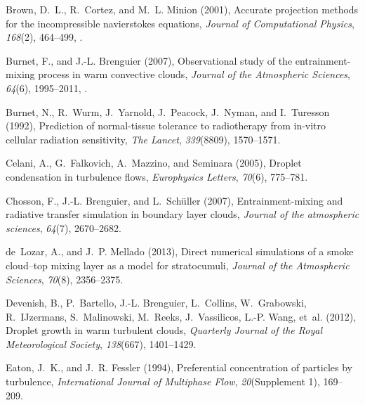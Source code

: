 \documentclass[draft,linenumbers]{AGUJournal}
\begin{document}
\begin{thebibliography}{60}
Brown, D.~L., R.~Cortez, and M.~L. Minion (2001), Accurate projection methods
  for the incompressible navier{\textendash}stokes equations, \textit{Journal
  of Computational Physics}, \textit{168}(2), 464--499,
  .

Burnet, F., and J.-L. Brenguier (2007), Observational study of the
  entrainment-mixing process in warm convective clouds, \textit{Journal of the
  Atmospheric Sciences}, \textit{64}(6), 1995--2011, .

Burnet, N., R.~Wurm, J.~Yarnold, J.~Peacock, J.~Nyman, and I.~Turesson (1992),
  Prediction of normal-tissue tolerance to radiotherapy from in-vitro cellular
  radiation sensitivity, \textit{The Lancet}, \textit{339}(8809), 1570--1571.

Celani, A., G.~Falkovich, A.~Mazzino, and Seminara (2005), Droplet condensation
  in turbulence flows, \textit{Europhysics Letters}, \textit{70}(6), 775--781.

Chosson, F., J.-L. Brenguier, and L.~Sch{\"u}ller (2007), Entrainment-mixing
  and radiative transfer simulation in boundary layer clouds, \textit{Journal
  of the atmospheric sciences}, \textit{64}(7), 2670--2682.

de~Lozar, A., and J.~P. Mellado (2013), Direct numerical simulations of a smoke
  cloud--top mixing layer as a model for stratocumuli, \textit{Journal of the
  Atmospheric Sciences}, \textit{70}(8), 2356--2375.

Devenish, B., P.~Bartello, J.-L. Brenguier, L.~Collins, W.~Grabowski,
  R.~IJzermans, S.~Malinowski, M.~Reeks, J.~Vassilicos, L.-P. Wang, et~al.
  (2012), Droplet growth in warm turbulent clouds, \textit{Quarterly Journal of
  the Royal Meteorological Society}, \textit{138}(667), 1401--1429.

Eaton, J.~K., and J.~R. Fessler (1994), Preferential concentration of particles
  by turbulence, \textit{International Journal of Multiphase Flow},
  \textit{20}(Supplement 1), 169--209.


\end{thebibliography}
\end{document}
